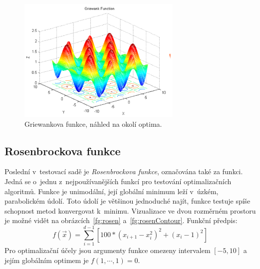 \begin{figure}[H]
	\centering
	\includegraphics[width=0.7\textwidth]{obrazky-figures/griewank_zoom.png}
	\caption{Griewankova funkce, náhled na okolí optima.}
	\label{fg:griewankZoom}
\end{figure}



\subsection{Rosenbrockova funkce}
Poslední v~testovací sadě je \textit{Rosenbrockova funkce}, označována také za  funkci. Jedná se o~jednu z~nejpoužívanějších funkcí pro testování optimalizačních algoritmů. Funkce je unimodální, její globální minimum leží v~úzkém, parabolickém údolí. Toto údolí je většinou jednoduché najít, funkce testuje spíše schopnost metod konvergovat k~minimu. Vizualizace ve dvou rozměrném prostoru je možné vidět na obrázcích~\ref{fg:rosen} a~\ref{fg:rosenContour}. Funkční předpis:
\begin{equation}
f(\Vec{x}) = \sum_{i=1}^{d-1}[ 100*(x_{i+1} - x_{i}^2)^{2} + (x_{i} - 1)^{2}]
\label{eq:boha}
\end{equation}
Pro optimalizační účely jsou argumenty funkce omezeny intervalem $[-5, 10]$ a jejím globálním optimem je $f(1, \cdots, 1) = 0$.


